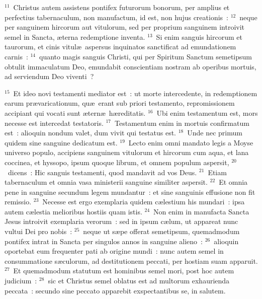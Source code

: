 ${}^{11}$~Christus autem assistens pontifex futurorum bonorum, per amplius et perfectius tabernaculum, non manufactum, id est, non hujus creationis~:
${}^{12}$~neque per sanguinem hircorum aut vitulorum, sed per proprium sanguinem introivit semel in Sancta, \ae terna redemptione inventa.
${}^{13}$~Si enim sanguis hircorum et taurorum, et cinis vitul\ae\ aspersus inquinatos sanctificat ad emundationem carnis~:
${}^{14}$~quanto magis sanguis Christi, qui per Spiritum Sanctum semetipsum obtulit immaculatum Deo, emundabit conscientiam nostram ab operibus mortuis, ad serviendum Deo viventi~?


${}^{15}$~Et ideo novi testamenti mediator est~: ut morte intercedente, in redemptionem earum pr\ae varicationum, qu\ae\ erant sub priori testamento, repromissionem accipiant qui vocati sunt \ae tern\ae\ h\ae reditatis.
${}^{16}$~Ubi enim testamentum est, mors necesse est intercedat testatoris.
${}^{17}$~Testamentum enim in mortuis confirmatum est~: alioquin nondum valet, dum vivit qui testatus est.
${}^{18}$~Unde nec primum quidem sine sanguine dedicatum est.
${}^{19}$~Lecto enim omni mandato legis a Moyse universo populo, accipiens sanguinem vitulorum et hircorum cum aqua, et lana coccinea, et hyssopo, ipsum quoque librum, et omnem populum aspersit,
${}^{20}$~dicens~: Hic sanguis testamenti, quod mandavit ad vos Deus.
${}^{21}$~Etiam tabernaculum et omnia vasa ministerii sanguine similiter aspersit.
${}^{22}$~Et omnia pene in sanguine secundum legem mundantur~: et sine sanguinis effusione non fit remissio.
${}^{23}$~Necesse est ergo exemplaria quidem c\ae lestium his mundari~: ipsa autem c\ae lestia melioribus hostiis quam istis.
${}^{24}$~Non enim in manufacta Sancta Jesus introivit exemplaria verorum~: sed in ipsum c\ae lum, ut appareat nunc vultui Dei pro nobis~:
${}^{25}$~neque ut s\ae pe offerat semetipsum, quemadmodum pontifex intrat in Sancta per singulos annos in sanguine alieno~:
${}^{26}$~alioquin oportebat eum frequenter pati ab origine mundi~: nunc autem semel in consummatione s\ae culorum, ad destitutionem peccati, per hostiam suam apparuit.
${}^{27}$~Et quemadmodum statutum est hominibus semel mori, post hoc autem judicium~:
${}^{28}$~sic et Christus semel oblatus est ad multorum exhaurienda peccata~: secundo sine peccato apparebit exspectantibus se, in salutem.

